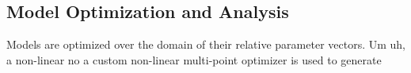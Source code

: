 \subsection{Model Optimization and Analysis}

Models are optimized over the domain of their relative parameter vectors. Um uh, a non-linear no a custom non-linear multi-point optimizer is used to generate 

\subsubsection{}